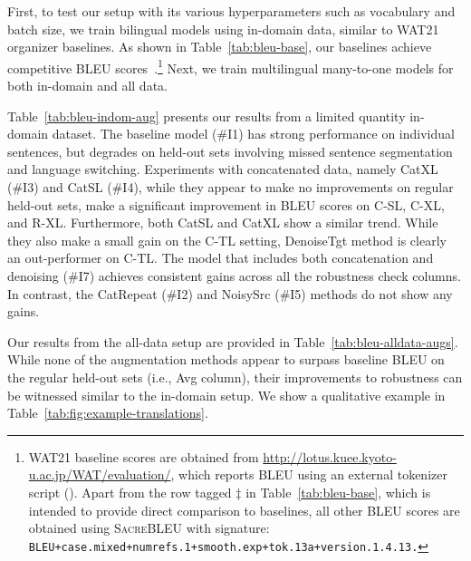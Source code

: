 First, to test our setup with its various hyperparameters such as vocabulary and batch size, we train bilingual models using in-domain data, similar to WAT21 organizer baselines.
As shown in Table~\ref{tab:bleu-base}, our baselines achieve competitive BLEU scores~\cite{papineni-etal-2002-bleu}.\footnote{WAT21 baseline scores are obtained from \url{http://lotus.kuee.kyoto-u.ac.jp/WAT/evaluation/}, which reports BLEU using an external tokenizer script (). 
Apart from the row tagged $\ddag$ in Table~\ref{tab:bleu-base}, which is intended to provide direct comparison to baselines, all other BLEU scores are
obtained using \textsc{SacreBLEU} with signature: \texttt{BLEU+case.mixed+numrefs.1+smooth.exp+tok.13a+version.1.4.13.}} 
Next, we train multilingual many-to-one models for both in-domain and all data.

Table~\ref{tab:bleu-indom-aug} presents our results from a limited quantity in-domain dataset.
The baseline model (\#I1) has strong performance on individual sentences, but degrades on held-out sets involving missed sentence segmentation and language switching.
Experiments with concatenated data, namely CatXL (\#I3) and CatSL (\#I4), while they appear to make no improvements on regular held-out sets, make a significant improvement in BLEU scores on C-SL, C-XL, and R-XL.
Furthermore, both CatSL and CatXL show a similar trend.
While they also make a small gain on the C-TL setting, DenoiseTgt method is clearly an out-performer on C-TL.
The model that includes both concatenation and denoising (\#I7) achieves consistent gains across all the robustness check columns.
In contrast, the CatRepeat (\#I2) and NoisySrc (\#I5) methods do not show any gains.

Our results from the all-data setup are provided in Table~\ref{tab:bleu-alldata-augs}. 
While none of the augmentation methods appear to surpass baseline BLEU on the regular held-out sets (i.e., Avg column), their improvements to robustness can be witnessed similar to the in-domain setup. 
We show a qualitative example in Table~\ref{tab:fig:example-translations}.


